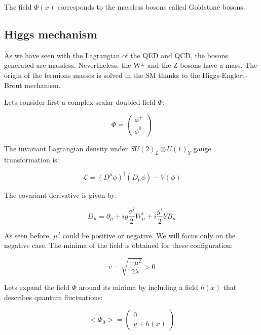     The field $\Phi(x)$ corresponds to the massless bosons called Goldstone bosons.


    \subsection{Higgs mechanism}

    As we have seen with the Lagrangian of the QED and QCD, the bosons generated are massless. Nevertheless, the W$^{\pm}$ and the Z bosons have a mass. 
    The origin of the fermions masses is solved in the SM thanks to the Higgs-Englert-Brout mechanism. \cite{PhysRevLett.13.508}

    Lets consider first a complex scalar doubled field $\Phi$:
    
    \begin{equation}
       \Phi = \begin{pmatrix}
                \phi^{+}\\
                \phi^{0}
              \end{pmatrix}
    \end{equation}

     The invariant Lagrangian density under $SU(2)_L \otimes U(1)_Y$ gauge transformation is:

    \begin{equation}
      \mathcal{L} = \left(D^{\mu} \phi \right)^{\dagger} \left( D_{\mu} \phi \right) - V(\phi)
      \label{eq:lagrangianHiggs}
    \end{equation}    
    
    The covariant derivative is given by:
    
    \begin{equation}
      D_{\mu} = \partial_{\mu} + i g \frac{\sigma^i}{2} W^i_{\mu} + i\frac{g'}{2}YB_{\mu}
    \end{equation}        
    
    As seen before, $\mu^2$ could be positive or negative.
    We will focus only on the negative case. 
    The minima of the field is obtained for these configuration: 

    \begin{equation}
      v = \sqrt{\frac{- \mu^2}{2\lambda}} > 0
      \label{eq:v}
    \end{equation}

    Lets expand the field $\Phi$ around its minima by including a field $h(x)$ that describes quantum fluctuations:

    \begin{equation}
      <\Phi_0> = \begin{pmatrix}
                   0 \\
                   v + h(x)
                 \end{pmatrix}
      \label{eq:fieldHiggs}
    \end{equation}

